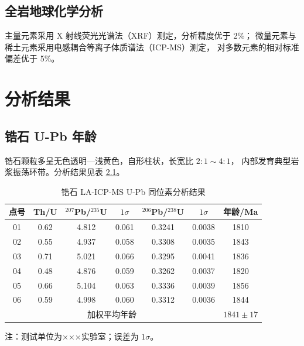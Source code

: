 \documentclass[master]{cugthesis}
\begin{document}
\section{全岩地球化学分析}

主量元素采用 X 射线荧光光谱法（XRF）测定，分析精度优于 2\%；
微量元素与稀土元素采用电感耦合等离子体质谱法（ICP-MS）测定，
对多数元素的相对标准偏差优于 5\%。

\chapter{分析结果}

\section{锆石 U-Pb 年龄}

锆石颗粒多呈无色透明—浅黄色，自形柱状，长宽比 $2{:}1\sim4{:}1$，
内部发育典型岩浆振荡环带。分析结果见表 \ref{tab:zircon}。

\begin{table}[htbp]
    \centering
    \caption{锆石 LA-ICP-MS U-Pb 同位素分析结果}
    \label{tab:zircon}
    \small
    \begin{tabular}{ccccccc}
        \toprule
        点号 & Th/U & $^{207}$Pb/$^{235}$U & $1\sigma$ & $^{206}$Pb/$^{238}$U
             & $1\sigma$ & 年龄/Ma \\
        \midrule
        01 & 0.62 & 4.812 & 0.061 & 0.3241 & 0.0038 & 1810 \\
        02 & 0.55 & 4.937 & 0.058 & 0.3308 & 0.0035 & 1843 \\
        03 & 0.71 & 5.021 & 0.066 & 0.3295 & 0.0041 & 1836 \\
        04 & 0.48 & 4.876 & 0.059 & 0.3262 & 0.0037 & 1820 \\
        05 & 0.66 & 5.104 & 0.063 & 0.3336 & 0.0039 & 1856 \\
        06 & 0.59 & 4.998 & 0.060 & 0.3312 & 0.0036 & 1844 \\
        \midrule
        \multicolumn{6}{c}{加权平均年龄} & $1841\pm17$ \\
        \bottomrule
    \end{tabular}
    \begin{flushleft}
        \footnotesize 注：测试单位为×××实验室；误差为 $1\sigma$。
    \end{flushleft}
\end{table}
\end{document}
